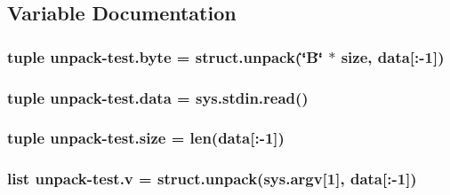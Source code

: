 \subsection{Variable Documentation}
\hypertarget{namespaceunpack-test_a055c4497265d0014aa3db51153f7bce7}{
\subsubsection[{byte}]{\setlength{\rightskip}{0pt plus 5cm}tuple unpack-\/test.\-byte = struct.\-unpack(\char`\"{}B\char`\"{} $\ast$ size, {\bf data}\mbox{[}\-:-\/1\mbox{]})}}\label{namespaceunpack-test_a055c4497265d0014aa3db51153f7bce7}
\hypertarget{namespaceunpack-test_a3658f239ff3dd1c4b74ee01aa28503ae}{
\subsubsection[{data}]{\setlength{\rightskip}{0pt plus 5cm}tuple unpack-\/test.\-data = sys.\-stdin.\-read()}}\label{namespaceunpack-test_a3658f239ff3dd1c4b74ee01aa28503ae}
\hypertarget{namespaceunpack-test_a2bd26e3ecd1f57e05d13af8753da003c}{
\subsubsection[{size}]{\setlength{\rightskip}{0pt plus 5cm}tuple unpack-\/test.\-size = len({\bf data}\mbox{[}\-:-\/1\mbox{]})}}\label{namespaceunpack-test_a2bd26e3ecd1f57e05d13af8753da003c}
\hypertarget{namespaceunpack-test_a0b46ee9f8c169bb06c3f38266388decd}{
\subsubsection[{v}]{\setlength{\rightskip}{0pt plus 5cm}list unpack-\/test.\-v = struct.\-unpack(sys.\-argv\mbox{[}1\mbox{]}, {\bf data}\mbox{[}\-:-\/1\mbox{]})}}\label{namespaceunpack-test_a0b46ee9f8c169bb06c3f38266388decd}
